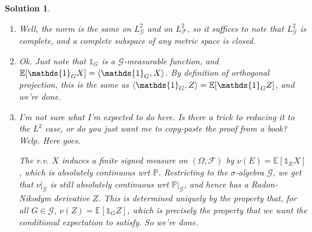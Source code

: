 \documentclass{article}
\theoremstyle{nonumberplain}
\newtheorem{sol}{Solution}
\newcommand{\ind}{\mathds{1}}
\DeclarePairedDelimiter{\braket}{\langle}{\rangle}
\newcommand{\EV}{\mathbb{E}}
\newcommand{\PP}{\mathbb{P}}
\newcommand{\sa}[1]{\mathcal{#1}}
\begin{document}
\begin{sol}
\leavevmode
\begin{enumerate}
\item Well, the norm is the same on $L^2_{\sa G}$ and on $L^2_{\sa F}$, so it suffices to note that $L^2_{\sa G}$ is complete, and a complete subspace of any metric space is closed.

\item Ok. Just note that $\ind_G$ is a $\sa G$-measurable function, and $\EV[\ind_G X] = \braket{\ind_G, X}$. By definition of orthogonal projection, this is the same as $\braket{\ind_G, Z} = \EV[\ind_G Z]$, and we're done.

\item I'm not sure what I'm expected to do here. Is there a trick to reducing it to the $L^2$ case, or do you just want me to copy-paste the proof from a book? Welp. Here goes.

The r.v. $X$ induces a finite signed measure on $(\Omega, \sa F)$ by $\nu(E) = \EV[\ind_E X]$, which is absolutely continuous wrt $\PP$. Restricting to the $\sigma$-algebra $\sa G$, we get that $\nu|_{\sa G}$ is still absolutely continuous wrt $\PP|_{\sa G}$, and hence has a Radon-Nikodym derivative $Z$. This is determined uniquely by the property that, for all $G \in \sa G$, $\nu(Z) = \EV[\ind_G Z]$, which is precisely the property that we want the conditional expectation to satisfy. So we're done.
\end{enumerate}
\end{sol}
\end{document}
